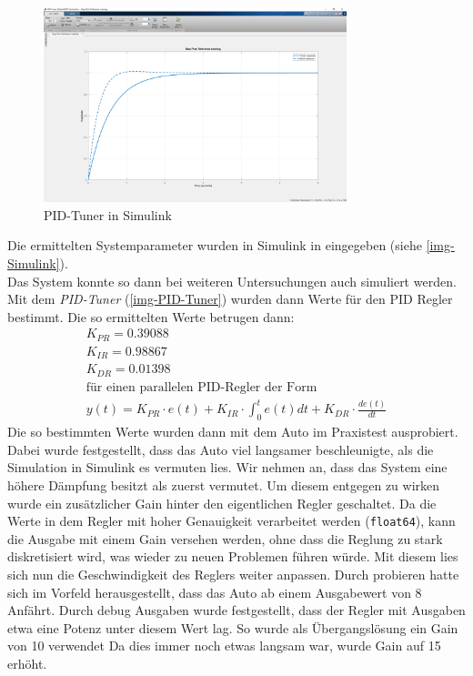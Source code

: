 \documentclass[a4paper,12pt]{report}
\begin{document}
	\begin{figure}[ht]
		\centering
		\includegraphics[width=250pt,keepaspectratio]{assets/PID-Tuner.PNG}
		\caption{PID-Tuner in Simulink}
		\label{img-PID-Tuner}
	\end{figure}

	Die ermittelten Systemparameter wurden in Simulink in eingegeben (siehe \autoref{img-Simulink}). \\
	Das System konnte so dann bei weiteren Untersuchungen auch simuliert werden. \\
	Mit dem \emph{PID-Tuner} (\autoref{img-PID-Tuner}) wurden dann Werte für den PID Regler bestimmt.
	Die so ermittelten Werte betrugen dann: \\
	\begin{gather*}
		K_{PR} = 0.39088 \\
		K_{IR} = 0.98867 \\
		K_{DR} = 0.01398 \\
		\text{für einen parallelen PID-Regler der Form}\\
		y(t) = K_{PR} \cdot e(t) + K_{IR} \cdot \int_{0}^{t} e(t)dt + K_{DR} \cdot \frac{de(t)}{dt}
	\end{gather*}
	Die so bestimmten Werte wurden dann mit dem Auto im Praxistest ausprobiert.
	Dabei wurde festgestellt, dass das Auto viel langsamer beschleunigte, als die Simulation in Simulink es vermuten lies.
	Wir nehmen an, dass das System eine höhere Dämpfung besitzt als zuerst vermutet.
	Um diesem entgegen zu wirken wurde ein zusätzlicher Gain hinter den eigentlichen Regler geschaltet.
	Da die Werte in dem Regler mit hoher Genauigkeit verarbeitet werden (\texttt{float64}), kann die Ausgabe mit einem Gain versehen werden, ohne dass die Reglung zu stark diskretisiert wird, was wieder zu neuen Problemen führen würde.
	Mit diesem lies sich nun die Geschwindigkeit des Reglers weiter anpassen.
	Durch probieren hatte sich im Vorfeld herausgestellt, dass das Auto ab einem Ausgabewert von 8 Anfährt.
	Durch debug Ausgaben wurde festgestellt, dass der Regler mit Ausgaben etwa eine Potenz unter diesem Wert lag.
	So wurde als Übergangslösung ein Gain von 10 verwendet
	 Da dies immer noch etwas langsam war, wurde Gain auf 15 erhöht. \\
\end{document}
